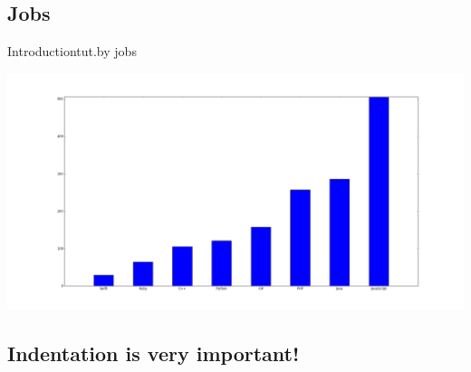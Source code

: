 \documentclass[10pt]{beamer}
\begin{document}
\subsection{Jobs}

\begin{frame}{Introduction}{tut.by jobs}
\begin{center}
\includegraphics[width=1.1\textwidth]{pictures/minsk_job_tutby.png}
\end{center}
\end{frame}

\subsection{Indentation is very important!}



	
	
%
%
%
%	
\end{document}
